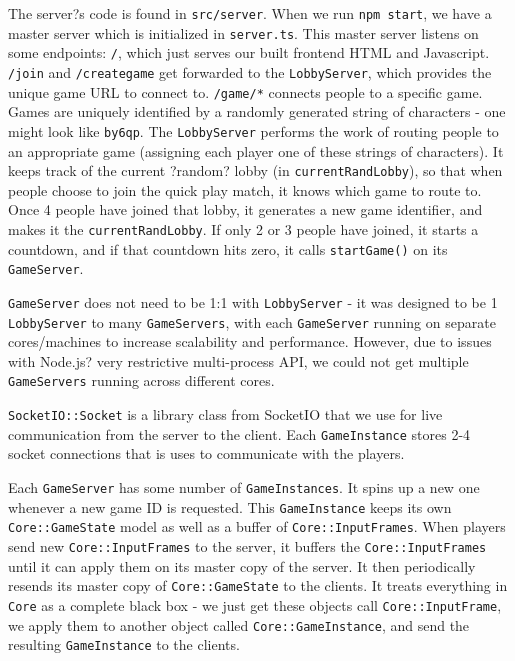 \documentclass[12pt]{report}
\begin{document}
The server?s code is found in \texttt{src/server}. When we run \texttt{npm start}, we have a master server which is initialized in \texttt{server.ts}. This master server listens on some endpoints: \texttt{/}, which just serves our built frontend HTML and Javascript. \texttt{/join} and \texttt{/creategame} get forwarded to the \texttt{LobbyServer}, which provides the unique game URL to connect to. \texttt{/game/*} connects people to a specific game.
Games are uniquely identified by a randomly generated string of characters - one might look like \texttt{by6qp}. The \texttt{LobbyServer} performs the work of routing people to an appropriate game (assigning each player one of these strings of characters). It keeps track of the current ?random? lobby (in \texttt{currentRandLobby}), so that when people choose to join the quick play match, it knows which game to route to. Once 4 people have joined that lobby, it generates a new game identifier, and makes it the \texttt{currentRandLobby}. If only 2 or 3 people have joined, it starts a countdown, and if that countdown hits zero, it calls \texttt{startGame()} on its \texttt{GameServer}.


\texttt{GameServer} does not need to be 1:1 with \texttt{LobbyServer} - it was designed to be 1 \texttt{LobbyServer} to many \texttt{GameServers}, with each \texttt{GameServer} running on separate cores/machines to increase scalability and performance. However, due to issues with Node.js? very restrictive multi-process API, we could not get multiple \texttt{GameServers} running across different cores.


\texttt{SocketIO::Socket} is a library class from SocketIO that we use for live communication from the server to the client. Each \texttt{GameInstance} stores 2-4 socket connections that is uses to communicate with the players.


Each \texttt{GameServer} has some number of \texttt{GameInstances}. It spins up a new one whenever a new game ID is requested. This \texttt{GameInstance} keeps its own  \texttt{Core::GameState} model as well as a buffer of \texttt{Core::InputFrames}. When players send new \texttt{Core::InputFrames} to the server, it buffers the \texttt{Core::InputFrames} until it can apply them on its master copy of the server. It then periodically resends its master copy of \texttt{Core::GameState} to the clients. It treats everything in \texttt{Core} as a complete black box - we just get these objects call \texttt{Core::InputFrame}, we apply them to another object called \texttt{Core::GameInstance}, and send the resulting \texttt{GameInstance} to the clients.
\end{document}
